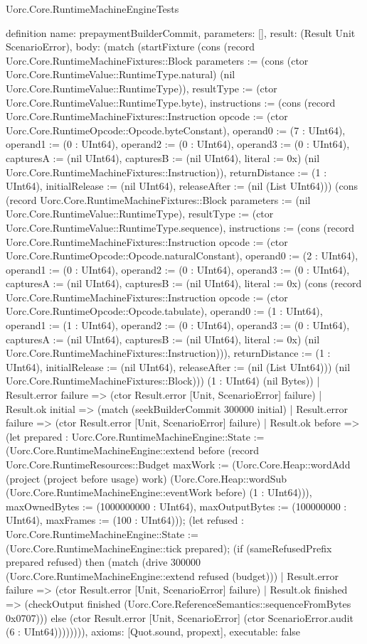\begin{lexlean}{Uorc.Core.RuntimeMachineEngineTests}
\begin{semanticmodule}
definition{
  name: prepaymentBuilderCommit,
  parameters: [],
  result: (Result Unit ScenarioError),
  body: (match (startFixture (cons (record Uorc.Core.RuntimeMachineFixtures::Block {parameters := (cons (ctor Uorc.Core.RuntimeValue::RuntimeType.natural) (nil Uorc.Core.RuntimeValue::RuntimeType)), resultType := (ctor Uorc.Core.RuntimeValue::RuntimeType.byte), instructions := (cons (record Uorc.Core.RuntimeMachineFixtures::Instruction {opcode := (ctor Uorc.Core.RuntimeOpcode::Opcode.byteConstant), operand0 := (7 : UInt64), operand1 := (0 : UInt64), operand2 := (0 : UInt64), operand3 := (0 : UInt64), capturesA := (nil UInt64), capturesB := (nil UInt64), literal := 0x}) (nil Uorc.Core.RuntimeMachineFixtures::Instruction)), returnDistance := (1 : UInt64), initialRelease := (nil UInt64), releaseAfter := (nil (List UInt64))}) (cons (record Uorc.Core.RuntimeMachineFixtures::Block {parameters := (nil Uorc.Core.RuntimeValue::RuntimeType), resultType := (ctor Uorc.Core.RuntimeValue::RuntimeType.sequence), instructions := (cons (record Uorc.Core.RuntimeMachineFixtures::Instruction {opcode := (ctor Uorc.Core.RuntimeOpcode::Opcode.naturalConstant), operand0 := (2 : UInt64), operand1 := (0 : UInt64), operand2 := (0 : UInt64), operand3 := (0 : UInt64), capturesA := (nil UInt64), capturesB := (nil UInt64), literal := 0x}) (cons (record Uorc.Core.RuntimeMachineFixtures::Instruction {opcode := (ctor Uorc.Core.RuntimeOpcode::Opcode.tabulate), operand0 := (1 : UInt64), operand1 := (1 : UInt64), operand2 := (0 : UInt64), operand3 := (0 : UInt64), capturesA := (nil UInt64), capturesB := (nil UInt64), literal := 0x}) (nil Uorc.Core.RuntimeMachineFixtures::Instruction))), returnDistance := (1 : UInt64), initialRelease := (nil UInt64), releaseAfter := (nil (List UInt64))}) (nil Uorc.Core.RuntimeMachineFixtures::Block))) (1 : UInt64) (nil Bytes))
    | Result.error failure => (ctor Result.error [Unit, ScenarioError] failure)
    | Result.ok initial => (match (seekBuilderCommit 300000 initial)
      | Result.error failure => (ctor Result.error [Unit, ScenarioError] failure)
      | Result.ok before => (let prepared : Uorc.Core.RuntimeMachineEngine::State := (Uorc.Core.RuntimeMachineEngine::extend before (record Uorc.Core.RuntimeResources::Budget {maxWork := (Uorc.Core.Heap::wordAdd (project (project before usage) work) (Uorc.Core.Heap::wordSub (Uorc.Core.RuntimeMachineEngine::eventWork before) (1 : UInt64))), maxOwnedBytes := (1000000000 : UInt64), maxOutputBytes := (100000000 : UInt64), maxFrames := (100 : UInt64)})); (let refused : Uorc.Core.RuntimeMachineEngine::State := (Uorc.Core.RuntimeMachineEngine::tick prepared); (if (sameRefusedPrefix prepared refused) then (match (drive 300000 (Uorc.Core.RuntimeMachineEngine::extend refused (budget)))
        | Result.error failure => (ctor Result.error [Unit, ScenarioError] failure)
        | Result.ok finished => (checkOutput finished (Uorc.Core.ReferenceSemantics::sequenceFromBytes 0x0707))) else (ctor Result.error [Unit, ScenarioError] (ctor ScenarioError.audit (6 : UInt64)))))))),
  axioms: [Quot.sound, propext],
  executable: false
}


\end{semanticmodule}
\end{lexlean}
